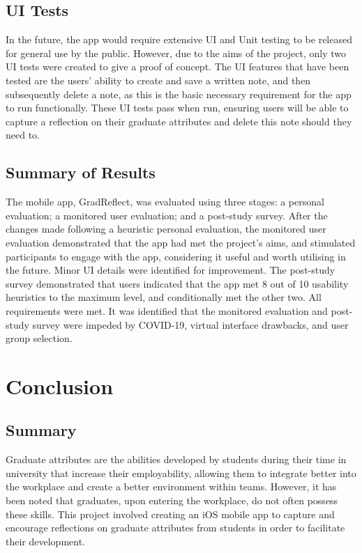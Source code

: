 \documentclass{l4proj}
\begin{document}
\section{UI Tests}

In the future, the app would require extensive UI and Unit testing to be released for general use by the public. However, due to the aims of the project, only two UI tests were created to give a proof of concept. The UI features that have been tested are the users' ability to create and save a written note, and then subsequently delete a note, as this is the basic necessary requirement for the app to run functionally. These UI tests pass when run, ensuring users will be able to capture a reflection on their graduate attributes and delete this note should they need to.

\section{Summary of Results}

The mobile app, GradReflect, was evaluated using three stages: a personal evaluation; a monitored user evaluation; and a post-study survey. After the changes made following a heuristic personal evaluation, the monitored user evaluation demonstrated that the app had met the project’s aims, and stimulated participants to engage with the app, considering it useful and worth utilising in the future. Minor UI details were identified for improvement. The post-study survey demonstrated that users indicated that the app met 8 out of 10 usability heuristics to the maximum level, and conditionally met the other two. All requirements were met. It was identified that the monitored evaluation and post-study survey were impeded by COVID-19, virtual interface drawbacks, and user group selection.


\chapter{Conclusion}  

\section{Summary}

Graduate attributes are the abilities developed by students during their time in university that increase their employability, allowing them to integrate better into the workplace and create a better environment within teams. However, it has been noted that graduates, upon entering the workplace, do not often possess these skills. This project involved creating an iOS mobile app to capture and encourage reflections on graduate attributes from students in order to facilitate their development.
\end{document}
